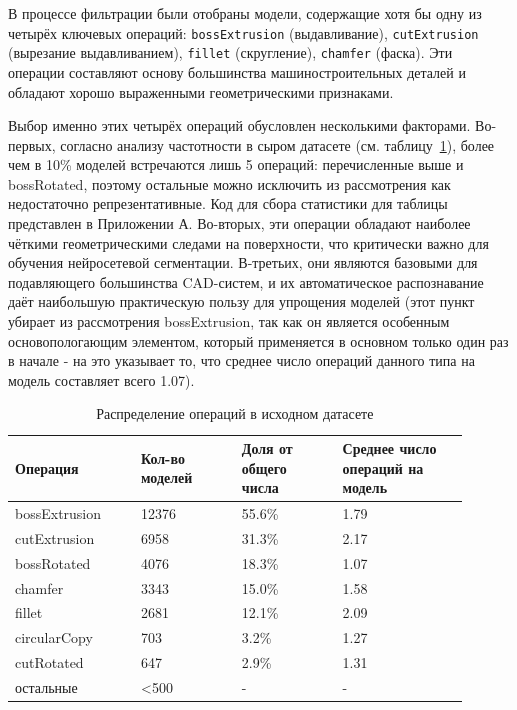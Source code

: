 В процессе фильтрации были отобраны модели, содержащие хотя бы одну из четырёх ключевых операций: \texttt{bossExtrusion} (выдавливание), \texttt{cutExtrusion} (вырезание выдавливанием), \texttt{fillet} (скругление), \texttt{chamfer} (фаска). Эти операции составляют основу большинства машиностроительных деталей и обладают хорошо выраженными геометрическими признаками.

Выбор именно этих четырёх операций обусловлен несколькими факторами. Во-первых, согласно анализу частотности в сыром датасете (см. таблицу~\ref{tab:ops-stats-raw}), более чем в 10\% моделей встречаются лишь 5 операций: перечисленные выше и bossRotated, поэтому остальные можно исключить из рассмотрения как недостаточно репрезентативные. Код для сбора статистики для таблицы представлен в Приложении А. Во-вторых, эти операции обладают наиболее чёткими геометрическими следами на поверхности, что критически важно для обучения нейросетевой сегментации. В-третьих, они являются базовыми для подавляющего большинства CAD-систем, и их автоматическое распознавание даёт наибольшую практическую пользу для упрощения моделей (этот пункт убирает из рассмотрения bossExtrusion, так как он является особенным основопологающим элементом, который применяется в основном только один раз в начале - на это указывает то, что среднее число операций данного типа на модель составляет всего 1.07).

\begin{table}[h]
\centering
\begin{tabular}{|p{0.25\linewidth}|p{0.2\linewidth}|p{0.2\linewidth}|p{0.25\linewidth}|}
\hline
\textbf{Операция} & \textbf{Кол-во моделей} & \textbf{Доля от общего числа} & \textbf{Среднее число операций на модель} \\
\hline
bossExtrusion & 12376 & 55.6\% & 1.79 \\
cutExtrusion & 6958 & 31.3\% & 2.17 \\
bossRotated & 4076 & 18.3\% & 1.07 \\
chamfer & 3343 & 15.0\% & 1.58 \\
fillet & 2681 & 12.1\% & 2.09 \\
circularCopy & 703 & 3.2\% & 1.27 \\
cutRotated & 647 & 2.9\% & 1.31 \\
остальные & <500 & - & - \\
\hline
\end{tabular}
\caption{Распределение операций в исходном датасете}
\label{tab:ops-stats-raw}
\end{table}

